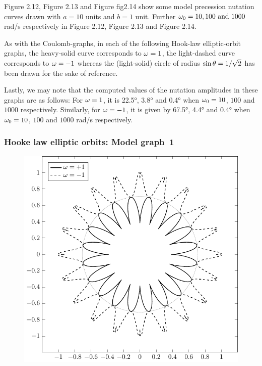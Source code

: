 Figure 2.12, Figure 2.13 and Figure fig2.14 
show some model precession nutation curves drawn with $a = 
10$ units and $b = 1$ unit. Further ${\omega}_{0} = 10, 100 
\text{ and } 1000$\si{rad/s} respectively in 
Figure 2.12, Figure 2.13 and Figure 2.14. 

As with the Coulomb-graphs,  in each of the following 
Hook-law elliptic-orbit graphs, the heavy-solid curve 
corresponds to ${\omega} = 1$, the light-dashed curve 
corresponds to ${\omega} = -1$ whereas the (light-solid) circle 
of radius $\sin {\theta} = 1 / \sqrt{2}$ has been drawn for the 
sake of reference. 

Lastly, we may note that the computed values of the nutation 
amplitudes in these graphs are as follows: For ${\omega} = 1$, 
it is \ang{22.5}, \ang{3.8} and \ang{0.4} when ${\omega}_{0} = 
10$, $100$ and $1000$ respectively. Similarly, for ${\omega} = 
-1$, it is given by \ang{67.5}, \ang{4.4} and \ang{0.4} when 
${\omega}_{0} = 10$, $100$ and $1000$ \si{rad/s} respectively.

\subsubsection*{Hooke law elliptic orbits: Model graph~1} 
\begin{figure}[H]
\centering
\includegraphics[scale=.5]{src/images/lbk-graphics/larm-h-10-1-45-1-10.pdf}
\caption*{}
\end{figure}

